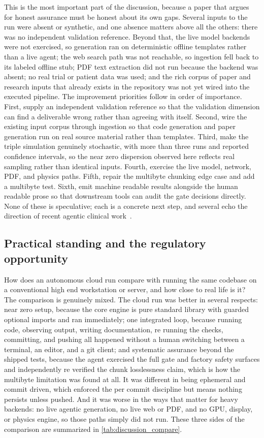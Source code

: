 This is the most important part of the discussion, because a paper that argues
for honest assurance must be honest about its own gaps. Several inputs to the run
were absent or synthetic, and one absence matters above all the others: there was
no independent validation reference. Beyond that, the live model backends were not
exercised, so generation ran on deterministic offline templates rather than a
live agent; the web search path was not reachable, so ingestion fell back to its
labeled offline stub; PDF text extraction did not run because the backend was
absent; no real trial or patient data was used; and the rich corpus of paper and
research inputs that already exists in the repository was not yet wired into the
executed pipeline. The improvement priorities follow in order of importance.
First, supply an independent validation reference so that the validation
dimension can find a deliverable wrong rather than agreeing with itself. Second,
wire the existing input corpus through ingestion so that code generation and
paper generation run on real source material rather than templates. Third, make
the triple simulation genuinely stochastic, with more than three runs and
reported confidence intervals, so the near zero dispersion observed here reflects
real sampling rather than identical inputs. Fourth, exercise the live model,
network, PDF, and physics paths. Fifth, repair the multibyte chunking edge case
and add a multibyte test. Sixth, emit machine readable results alongside the
human readable prose so that downstream tools can audit the gate decisions
directly. None of these is speculative; each is a concrete next step, and several
echo the direction of recent agentic clinical work~\cite{trooskens2026compiled,
kawchak2026prediction}.

\subsection{Practical standing and the regulatory opportunity}

How does an autonomous cloud run compare with running the same codebase on a
conventional high end workstation or server, and how close to real life is it?
The comparison is genuinely mixed. The cloud run was better in several respects:
near zero setup, because the core engine is pure standard library with guarded
optional imports and ran immediately; one integrated loop, because running code,
observing output, writing documentation, re running the checks, committing, and
pushing all happened without a human switching between a terminal, an editor, and
a git client; and systematic assurance beyond the shipped tests, because the
agent exercised the full gate and factory safety surfaces and independently re
verified the chunk losslessness claim, which is how the multibyte limitation was
found at all. It was different in being ephemeral and commit driven, which
enforced the per commit discipline but means nothing persists unless pushed. And
it was worse in the ways that matter for heavy backends: no live agentic
generation, no live web or PDF, and no GPU, display, or physics engine, so those
paths simply did not run. These three sides of the comparison are summarized in
\autoref{tab:discussion_compare}.

